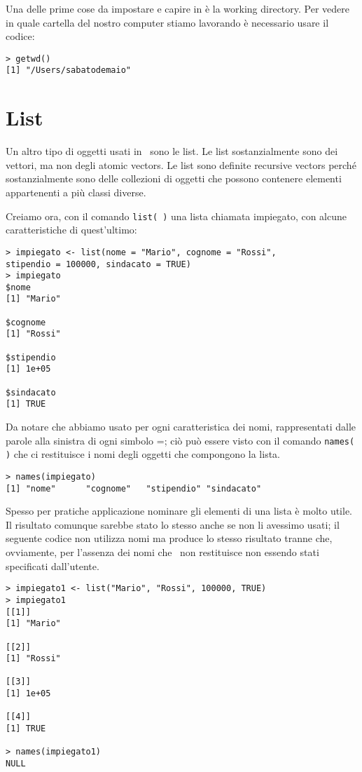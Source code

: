 Una delle prime cose da impostare e capire in \erre è la working directory. Per vedere in quale cartella del nostro computer stiamo lavorando è necessario usare il codice:
\begin{lstlisting}
> getwd()
[1] "/Users/sabatodemaio"
\end{lstlisting}


\section{List}
Un altro tipo di oggetti usati in \erre\ sono le list. Le list sostanzialmente sono dei vettori, ma non degli atomic vectors. Le list sono definite recursive vectors perché sostanzialmente sono delle collezioni di oggetti che possono contenere elementi appartenenti a più classi diverse.

Creiamo ora, con il comando \lstinline!list( )! una lista chiamata impiegato, con alcune caratteristiche di quest'ultimo:

\begin{lstlisting}
> impiegato <- list(nome = "Mario", cognome = "Rossi", 
stipendio = 100000, sindacato = TRUE)
> impiegato
$nome
[1] "Mario"

$cognome
[1] "Rossi"

$stipendio
[1] 1e+05

$sindacato
[1] TRUE
\end{lstlisting}

Da notare che abbiamo usato per ogni caratteristica dei nomi, rappresentati dalle parole alla sinistra di ogni simbolo =; ciò può essere visto con il comando \lstinline!names( )! che ci restituisce i nomi degli oggetti che compongono la lista.
\begin{lstlisting}
> names(impiegato)
[1] "nome"      "cognome"   "stipendio" "sindacato"
\end{lstlisting}

Spesso per pratiche applicazione nominare gli elementi di una lista è molto utile. Il risultato comunque sarebbe stato lo stesso anche se non li avessimo usati; il seguente codice non utilizza nomi ma produce lo stesso risultato tranne che, ovviamente, per l'assenza dei nomi che \erre\ non restituisce non essendo stati specificati dall'utente.
\begin{lstlisting}
> impiegato1 <- list("Mario", "Rossi", 100000, TRUE)
> impiegato1
[[1]]
[1] "Mario"

[[2]]
[1] "Rossi"

[[3]]
[1] 1e+05

[[4]]
[1] TRUE

> names(impiegato1)
NULL
\end{lstlisting}

